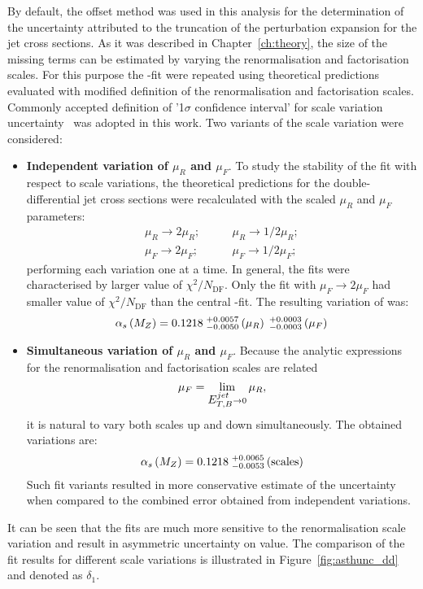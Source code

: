By default, the offset method was used in this analysis for the determination of the uncertainty attributed to the truncation of the perturbation expansion for the jet cross sections. As it was described in Chapter~\ref{ch:theory}, the size of the missing terms can be estimated by varying the renormalisation and factorisation scales. For this purpose the \asz-fit were repeated using theoretical predictions evaluated with modified definition of the renormalisation and factorisation scales. Commonly accepted definition of '1$\sigma$ confidence interval' for scale variation uncertainty~\cite{soper:1997} was adopted in this work. Two variants of the scale variation were considered:
\begin{itemize}
 \item \textbf{Independent variation of $\mu_R$ and $\mu_F$}. To study the stability of the fit with respect to scale variations, the theoretical predictions for the double-differential jet cross sections were recalculated with the scaled $\mu_R$ and $\mu_F$ parameters:
\begin{align}
 \mu_R \rightarrow 2\mu_R;&\qquad \mu_R \rightarrow 1/2\mu_R;\\
 \mu_F \rightarrow 2\mu_F;&\qquad \mu_F \rightarrow 1/2\mu_F;
\end{align}
performing each variation one at a time. In general, the fits were characterised by larger value of $\chi^2/N_\text{DF}$. Only the fit with $\mu_F \rightarrow 2\mu_F$ had smaller value of $\chi^2/N_\text{DF}$ than the central \asz-fit. The resulting variation of \asz was:
\begin{equation}
 \mbox{$\alpha_{s}\left(M_{Z}\right)$} = 0.1218\;^{+0.0057}_{-0.0050}\left(\mu_R\right)\;^{+0.0003}_{-0.0003}\left(\mu_F\right)
\end{equation}
\item \textbf{Simultaneous variation of $\mu_R$ and $\mu_F$}. Because the analytic expressions for the renormalisation and factorisation scales are related
\begin{equation}
 \mu_F = \lim_{\mbox{$E_{T,B}^{jet}$} \rightarrow 0} \mu_R,
\end{equation}
it is natural to vary both scales up and down simultaneously. The obtained variations are:
\begin{equation}
 \mbox{$\alpha_{s}\left(M_{Z}\right)$} = 0.1218\;^{+0.0065}_{-0.0053}\left(\text{scales}\right)
\end{equation}
Such fit variants resulted in more conservative estimate of the uncertainty when compared to the combined error obtained from independent variations. 
\end{itemize}
It can be seen that the fits are much more sensitive to the renormalisation scale variation and result in asymmetric uncertainty on \asz value. The comparison of the fit results for different scale variations is illustrated in Figure~\ref{fig:asthunc_dd} and denoted as $\delta_1$.

